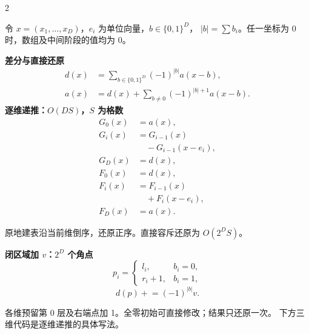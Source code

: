 \documentclass[UTF8,fontset=fandol,a4paper,twoside]{ctexart}
\newcommand{\note}[1]{{\fontsize{10}{12}\selectfont #1\par}}
\begin{document}
\begin{multicols}{2}
\note{令 $x=(x_1,\ldots,x_D)$，$e_i$ 为单位向量，$b\in\{0,1\}^D$，
$|b|=\sum b_i$。任一坐标为 0 时，数组及中间阶段的值均为 0。}
\textbf{差分与直接还原}
\begin{align*}
d(x)&=\sum_{b\in\{0,1\}^D}(-1)^{|b|}a(x-b),\\
a(x)&=d(x)+\sum_{b\ne0}(-1)^{|b|+1}a(x-b).
\end{align*}
\textbf{逐维递推：$O(DS)$，$S$ 为格数}
\begin{align*}
G_0(x)&=a(x),\\
G_i(x)&=G_{i-1}(x)\\
&\quad-G_{i-1}(x-e_i),\\
G_D(x)&=d(x),\\
F_0(x)&=d(x),\\
F_i(x)&=F_{i-1}(x)\\
&\quad+F_i(x-e_i),\\
F_D(x)&=a(x).
\end{align*}
\note{原地建表沿当前维倒序，还原正序。直接容斥还原为 $O(2^D S)$。}
\textbf{闭区域加 $v$：$2^D$ 个角点}
\[
p_i=\begin{cases}l_i,&b_i=0,\\r_i+1,&b_i=1,\end{cases}
\]
\[
d(p)\mathrel{+}=(-1)^{|b|}v.
\]
\note{各维预留第 0 层及右端点加 1。全零初始可直接修改；结果只还原一次。
下方三维代码是逐维递推的具体写法。}


\end{multicols}
\end{document}
